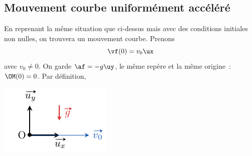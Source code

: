 \documentclass[../../main/main.tex]{subfiles}
\begin{document}
\subsection{Mouvement courbe uniformément accéléré}
\noindent
\begin{minipage}{0.70\linewidth}
	En reprenant la même situation que ci-dessus mais avec des conditions
	initiales non nulles, on trouvera un mouvement courbe. Prenons
	\[\vf(0) = v_0\ux\]
	avec $v_0 \neq 0$. On garde $\af = -g \uy$, le même repère et la même
	origine~: $\OM(0) = 0$. Par définition,
\end{minipage}
\hfill
\begin{minipage}{0.23\linewidth}
	\begin{center}
		\includegraphics[width=\linewidth]{vo_init}
	\end{center}
\end{minipage}
\end{document}
